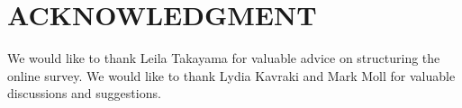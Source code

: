 \documentclass[letterpaper, 10 pt, conference]{ieeeconf}  %
\begin{document}






\section*{ACKNOWLEDGMENT}
We would like to thank Leila Takayama for valuable advice on structuring the online survey. We would like to thank Lydia Kavraki and Mark Moll for valuable discussions and suggestions. 


\end{document}
